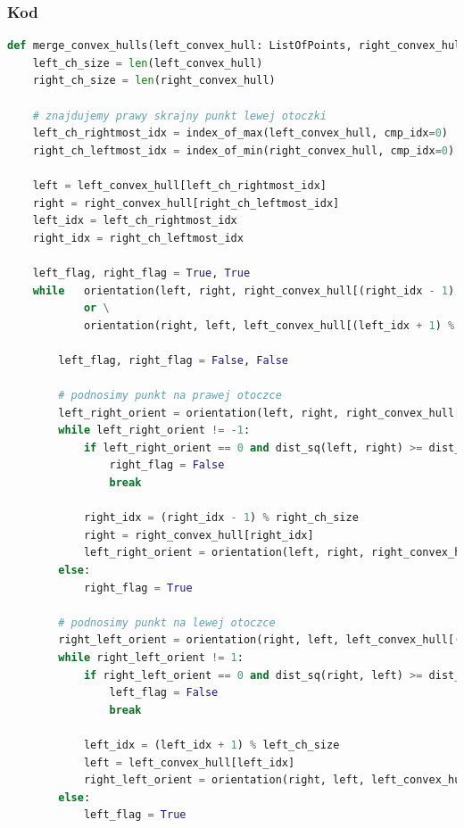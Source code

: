 \documentclass[11pt]{article}
\theoremstyle{remark} \newtheorem{definition}{def.}
\theoremstyle{definition} \newtheorem{twierdzenie}{tw.}
\begin{document}
    \subsubsection{Kod}
\begin{lstlisting}[language=Python]
def merge_convex_hulls(left_convex_hull: ListOfPoints, right_convex_hull: ListOfPoints) -> List[Point]:
    left_ch_size = len(left_convex_hull)
    right_ch_size = len(right_convex_hull)

    # znajdujemy prawy skrajny punkt lewej otoczki 
    left_ch_rightmost_idx = index_of_max(left_convex_hull, cmp_idx=0)
    right_ch_leftmost_idx = index_of_min(right_convex_hull, cmp_idx=0)
    
    left = left_convex_hull[left_ch_rightmost_idx]
    right = right_convex_hull[right_ch_leftmost_idx]
    left_idx = left_ch_rightmost_idx
    right_idx = right_ch_leftmost_idx

    left_flag, right_flag = True, True
    while   orientation(left, right, right_convex_hull[(right_idx - 1) % right_ch_size]) != -1 and right_flag\
            or \
            orientation(right, left, left_convex_hull[(left_idx + 1) % left_ch_size]) != 1 and left_flag:

        left_flag, right_flag = False, False
        
        # podnosimy punkt na prawej otoczce
        left_right_orient = orientation(left, right, right_convex_hull[(right_idx - 1) % right_ch_size])
        while left_right_orient != -1:
            if left_right_orient == 0 and dist_sq(left, right) >= dist_sq(left, right_convex_hull[(right_idx - 1) % right_ch_size]):
                right_flag = False
                break
            
            right_idx = (right_idx - 1) % right_ch_size
            right = right_convex_hull[right_idx]
            left_right_orient = orientation(left, right, right_convex_hull[(right_idx - 1) % right_ch_size])
        else:
            right_flag = True

        # podnosimy punkt na lewej otoczce
        right_left_orient = orientation(right, left, left_convex_hull[(left_idx + 1) % left_ch_size])
        while right_left_orient != 1:
            if right_left_orient == 0 and dist_sq(right, left) >= dist_sq(right, left_convex_hull[(left_idx + 1) % left_ch_size]):
                left_flag = False
                break
            
            left_idx = (left_idx + 1) % left_ch_size
            left = left_convex_hull[left_idx]
            right_left_orient = orientation(right, left, left_convex_hull[(left_idx + 1) % left_ch_size])
        else:
            left_flag = True
            

\end{lstlisting}
\end{document}
